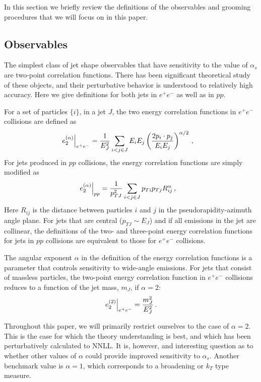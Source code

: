 
In this section we briefly review the definitions of the observables and grooming procedures that we will focus on in this paper.


\subsection{Observables}\label{sec:shape_def}


The simplest class of jet shape observables that have sensitivity to the value of $\alpha_s$ are two-point correlation functions. There has been significant theoretical study of these objects, and their perturbative behavior is understood to relatively high accuracy. Here we give definitions for both jets in $e^+e^-$ as well as in $pp$.


For a set of particles $\{i\}$, in a jet $J$, the two energy correlation functions in $e^+e^-$ collisions are defined as
\begin{align}\label{eq:eee2}
\left.e_{2}^{(\alpha)}\right|_{e^+e^-}&=\frac{1}{E_J^2}\sum_{i<j\in J} E_i E_j\left(
\frac{2p_i\cdot p_j}{E_i E_j}
\right)^{\alpha/2}\,, 
\end{align}
For jets produced in $pp$ collisions, the energy correlation functions are simply modified as
\begin{align}\label{eq:ppe2}
\left.e_{2}^{(\alpha)}\right|_{pp}&=\frac{1}{p_{TJ}^2}\sum_{i<j\in J} p_{Ti} p_{Tj}R_{ij}^\alpha\,, 
\end{align}
Here $R_{ij}$ is the distance between particles $i$ and $j$ in the pseudorapidity-azimuth angle plane.  For jets that are central ($p_{TJ} \sim E_J$) and if all emissions in the jet are collinear, the definitions of the two- and three-point energy correlation functions for jets in $pp$ collisions are equivalent to those for $e^+e^-$ collisions.

The angular exponent $\alpha$ in the definition of the energy correlation functions is a parameter that controls sensitivity to wide-angle emissions.  For jets that consist of massless particles, the two-point energy correlation function in $e^+e^-$ collisions reduces to a function of the jet mass, $m_J$, if $\alpha=2$:
\begin{equation}
\left.e_{2}^{(2)}\right|_{e^+e^-} = \frac{m_J^2}{E_J^2}\,.
\end{equation} 

Throughout this paper, we will primarily restrict ourselves to the case of $\alpha=2$. This is the case for which the theory understanding is best, and which has been perturbatively calculated to NNLL. It is, however, and interesting question as to whether other values of $\alpha$ could provide improved sensitivity to $\alpha_s$. Another benchmark value is $\alpha=1$, which corresponds to a broadening or $k_T$ type measure.

